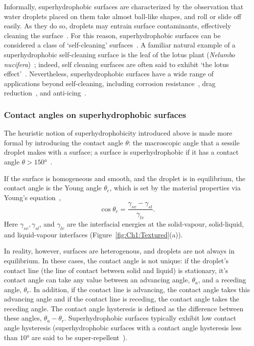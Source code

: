Informally, superhydrophobic surfaces are characterized by the observation that water droplets placed on them take almost ball-like shapes, and roll or slide off easily. As they do so, droplets may entrain surface contaminants, effectively cleaning the surface~\citep{Blossey2003Nature}. For this reason, superhydrophobic surfaces can be considered a class of `self-cleaning' surfaces~\citep{Liu2012AnnRevMaterSci}. A  familiar natural example of a superhydrophobic self-cleaning surface is the leaf of the lotus plant (\textit{Nelumbo nucifera})~\citep{Barthlott1997Planta}; indeed, self cleaning surfaces are often said to exhibit `the lotus effect'~\citep{Marmur2004Langmuir}. Nevertheless, superhydrophobic surfaces have a wide range of applications beyond self-cleaning, including corrosion resistance~\citep{Liu2011Nanoscale}, drag reduction~\citep{McHale2010SoftMatter}, and anti-icing~\citep{Meuler2010ACSnano}.


\subsubsection{Contact angles on superhydrophobic surfaces}
The heuristic notion of superhydrophobicity introduced above is made more formal by introducing the contact angle $\theta$: the macroscopic angle that a sessile droplet makes with a surface; a surface is superhydrophobic if it has a contact angle $\theta > 150\si{\degree}$~\citep{Ma2006CurrOpCollSci}.

If the surface is homogeneous and smooth, and the droplet is in equilibrium, the contact angle is the Young angle $\theta_e$, which is set by the material properties via Young's equation~\citep{Young1805PhilosTrans, deGennes1985RevModPhy},
 \begin{equation}\label{E:Ch1:Young}
 \cos \theta_e = \frac{\gamma_{sv} - \gamma_{sl}}{\gamma_{lv}}.
 \end{equation}
Here $\gamma_{sv}, \gamma_{sl}$, and $\gamma_{lv}$ are the interfacial energies at the solid-vapour, solid-liquid, and liquid-vapour interfaces (Figure~\ref{fig:Ch1:Textured}(a)).

In reality, however, surfaces are heterogenous, and droplets are not always in equilibrium. In these cases, the contact angle is not unique: if the droplet's contact line (the line of contact between solid and liquid) is stationary, it's contact angle can take any value between an advancing angle, $\theta_a$, and a receding angle, $\theta_r$. In addition, if the contact line is advancing, the contact angle takes this advancing angle and if the contact line is receding, the contact angle takes the receding angle. The contact angle hysteresis is defined as the difference between these angles, $\theta_a - \theta_r$. Superhydrophobic surfaces typically exhibit low contact angle hysteresis (superhydrophobic surfaces with a contact angle hysteresis less than $\si{10\degree}$ are said to be super-repellent~\citep{Attinger2016Nanoscale}).

